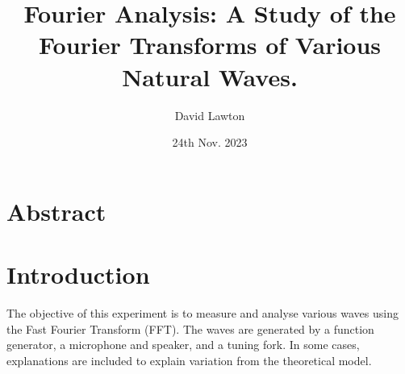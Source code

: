 \documentclass{article}
\title{Fourier Analysis: A Study of the Fourier Transforms of Various Natural Waves.}
\author{David Lawton}
\date{24th Nov. 2023}
\begin{document}
\maketitle
\vfill
\tableofcontents

\newpage
\section{Abstract}

\section{Introduction}
The objective of this experiment is to measure and analyse various waves using the Fast Fourier Transform (FFT). The waves are generated by a function generator, a microphone and speaker, and a tuning fork. In some cases, explanations are included to explain variation from the theoretical model.\\
\end{document}
